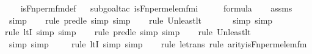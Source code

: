 \begin{isabellebody}
%
\isadelimproof
\isanewline
\ \ %
\endisadelimproof
%
\isatagproof
{}\isamarkupfalse%
\ is{\isacharunderscore}{\kern0pt}Fn{\isacharunderscore}{\kern0pt}perm{\isacharprime}{\kern0pt}{\isacharunderscore}{\kern0pt}fm{\isacharunderscore}{\kern0pt}def\isanewline
\ \ \isamarkupfalse%
{\isacharparenleft}{\kern0pt}subgoal{\isacharunderscore}{\kern0pt}tac\ {\isachardoublequoteopen}is{\isacharunderscore}{\kern0pt}Fn{\isacharunderscore}{\kern0pt}perm{\isacharprime}{\kern0pt}{\isacharunderscore}{\kern0pt}elem{\isacharunderscore}{\kern0pt}fm{\isacharparenleft}{\kern0pt}i\ {\isacharhash}{\kern0pt}{\isacharplus}{\kern0pt}\ {}{\isacharcomma}{\kern0pt}\ {}{\isacharcomma}{\kern0pt}\ {}{\isacharparenright}{\kern0pt}\ {\isasymin}\ formula{\isachardoublequoteclose}{\isacharparenright}{\kern0pt}\isanewline
\ \ \isamarkupfalse%
\ assms\isanewline
\ \ \isamarkupfalse%
\ simp\isanewline
\ \ \ \isamarkupfalse%
{\isacharparenleft}{\kern0pt}rule\ pred{\isacharunderscore}{\kern0pt}le{\isacharcomma}{\kern0pt}\ simp{\isacharcomma}{\kern0pt}\ simp{\isacharparenright}{\kern0pt}\isanewline
\ \ \ \isamarkupfalse%
{\isacharparenleft}{\kern0pt}rule\ Un{\isacharunderscore}{\kern0pt}least{\isacharunderscore}{\kern0pt}lt{\isacharparenright}{\kern0pt}{\isacharplus}{\kern0pt}\isanewline
\ \ \ \ \ \isamarkupfalse%
\ {\isacharparenleft}{\kern0pt}simp{\isacharcomma}{\kern0pt}\ simp{\isacharparenright}{\kern0pt}\isanewline
\ \ \ \ \isamarkupfalse%
{\isacharparenleft}{\kern0pt}rule\ ltI{\isacharcomma}{\kern0pt}\ simp{\isacharcomma}{\kern0pt}\ simp{\isacharparenright}{\kern0pt}\isanewline
\ \ \ \isamarkupfalse%
{\isacharparenleft}{\kern0pt}rule\ pred{\isacharunderscore}{\kern0pt}le{\isacharcomma}{\kern0pt}\ simp{\isacharcomma}{\kern0pt}\ simp{\isacharparenright}{\kern0pt}\isanewline
\ \ \ \isamarkupfalse%
{\isacharparenleft}{\kern0pt}rule\ Un{\isacharunderscore}{\kern0pt}least{\isacharunderscore}{\kern0pt}lt{\isacharparenright}{\kern0pt}{\isacharplus}{\kern0pt}\isanewline
\ \ \ \ \ \isamarkupfalse%
\ {\isacharparenleft}{\kern0pt}simp{\isacharcomma}{\kern0pt}\ simp{\isacharparenright}{\kern0pt}\isanewline
\ \ \ \ \isamarkupfalse%
{\isacharparenleft}{\kern0pt}rule\ ltI{\isacharcomma}{\kern0pt}\ simp{\isacharcomma}{\kern0pt}\ simp{\isacharparenright}{\kern0pt}\isanewline
\ \ \ \isamarkupfalse%
{\isacharparenleft}{\kern0pt}rule\ le{\isacharunderscore}{\kern0pt}trans{\isacharcomma}{\kern0pt}\ rule\ arity{\isacharunderscore}{\kern0pt}is{\isacharunderscore}{\kern0pt}Fn{\isacharunderscore}{\kern0pt}perm{\isacharprime}{\kern0pt}{\isacharunderscore}{\kern0pt}elem{\isacharunderscore}{\kern0pt}fm{\isacharparenright}{\kern0pt}\isanewline

\end{isabellebody}

